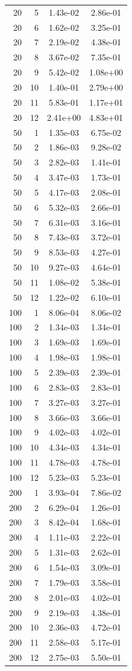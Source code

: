 \begin{longtable}{r r S[table-format=1.2e-2] S[table-format=1.2e-2]}
20 & 5 & 1.43e-02 & 2.86e-01 \\
20 & 6 & 1.62e-02 & 3.25e-01 \\
20 & 7 & 2.19e-02 & 4.38e-01 \\
20 & 8 & 3.67e-02 & 7.35e-01 \\
20 & 9 & 5.42e-02 & 1.08e+00 \\
20 & 10 & 1.40e-01 & 2.79e+00 \\
20 & 11 & 5.83e-01 & 1.17e+01 \\
20 & 12 & 2.41e+00 & 4.83e+01 \\
50 & 1 & 1.35e-03 & 6.75e-02 \\
50 & 2 & 1.86e-03 & 9.28e-02 \\
50 & 3 & 2.82e-03 & 1.41e-01 \\
50 & 4 & 3.47e-03 & 1.73e-01 \\
50 & 5 & 4.17e-03 & 2.08e-01 \\
50 & 6 & 5.32e-03 & 2.66e-01 \\
50 & 7 & 6.31e-03 & 3.16e-01 \\
50 & 8 & 7.43e-03 & 3.72e-01 \\
50 & 9 & 8.53e-03 & 4.27e-01 \\
50 & 10 & 9.27e-03 & 4.64e-01 \\
50 & 11 & 1.08e-02 & 5.38e-01 \\
50 & 12 & 1.22e-02 & 6.10e-01 \\
100 & 1 & 8.06e-04 & 8.06e-02 \\
100 & 2 & 1.34e-03 & 1.34e-01 \\
100 & 3 & 1.69e-03 & 1.69e-01 \\
100 & 4 & 1.98e-03 & 1.98e-01 \\
100 & 5 & 2.39e-03 & 2.39e-01 \\
100 & 6 & 2.83e-03 & 2.83e-01 \\
100 & 7 & 3.27e-03 & 3.27e-01 \\
100 & 8 & 3.66e-03 & 3.66e-01 \\
100 & 9 & 4.02e-03 & 4.02e-01 \\
100 & 10 & 4.34e-03 & 4.34e-01 \\
100 & 11 & 4.78e-03 & 4.78e-01 \\
100 & 12 & 5.23e-03 & 5.23e-01 \\
200 & 1 & 3.93e-04 & 7.86e-02 \\
200 & 2 & 6.29e-04 & 1.26e-01 \\
200 & 3 & 8.42e-04 & 1.68e-01 \\
200 & 4 & 1.11e-03 & 2.22e-01 \\
200 & 5 & 1.31e-03 & 2.62e-01 \\
200 & 6 & 1.54e-03 & 3.09e-01 \\
200 & 7 & 1.79e-03 & 3.58e-01 \\
200 & 8 & 2.01e-03 & 4.02e-01 \\
200 & 9 & 2.19e-03 & 4.38e-01 \\
200 & 10 & 2.36e-03 & 4.72e-01 \\
200 & 11 & 2.58e-03 & 5.17e-01 \\
200 & 12 & 2.75e-03 & 5.50e-01 \\
\end{longtable}
